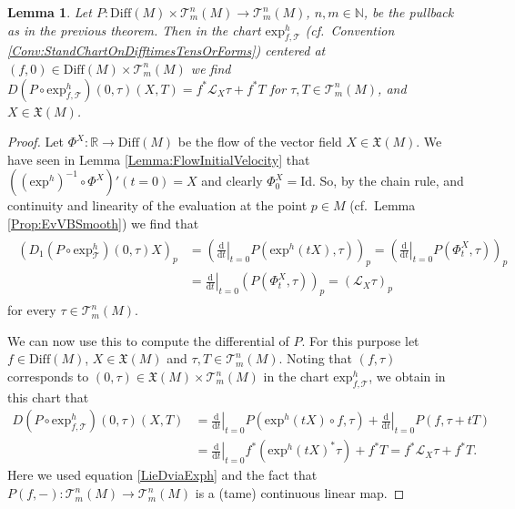 \documentclass[12pt,a4paper]{article}
\theoremstyle{plain}
\newtheorem{lemma}[theorem]{Lemma}
\theoremstyle{definition}
\newcommand{\R}{\mathbb{R}}
\newcommand{\N}{\mathbb{N}}
\newcommand{\VFs}{\mathfrak{X}(M)}
\newcommand{\LieD}{\mathcal{L}}
\newcommand{\Diff}{\mathrm{Diff}(M)}
\newcommand{\eh}[1]{\mathrm{exp}^h(#1)}
\newcommand{\exh}{\mathrm{exp}^h}
\newcommand{\Id}{\mathrm{Id}}
\newcommand{\tensf}[2]{\mathcal{T}^{#1}_{#2}(M)}
\renewcommand{\d}{\mathrm{d}}
\begin{document}
\begin{lemma}
\label{Lemma:PullbackDifferential}
Let $P:\Diff\times \tensf{n}{m}\to \tensf{n}{m}$, $n,m\in \N$, be the pullback as in the previous theorem. Then in the chart $\exh_{f,\mathcal T}$ (cf.~Convention \ref{Conv:StandChartOnDifftimesTensOrForms}) centered at $(f,0)\in \Diff\times \tensf{n}{m}$ we find $D(P\circ \exh_{f,\mathcal T})(0,\tau)(X,T)=f^*\LieD_X \tau+f^*T$ for
$\tau,T\in \tensf{n}{m}$, and $X\in \VFs$.  
\end{lemma}
\begin{proof}
Let $\Phi^X:\R\to \Diff$ be the flow of the vector field $X\in \VFs$. We have seen in Lemma \ref{Lemma:FlowInitialVelocity} that $((\exh)^{-1}\circ \Phi^X)'(t=0)=X$ and clearly $\Phi^X_0=\Id$. So, by the chain rule, and continuity and linearity of the evaluation at the point $p\in M$ (cf.~Lemma \ref{Prop:EvVBSmooth}) we find that
\begin{align}
\begin{split}
\label{LieDviaExph}
    \left(D_1(P\circ \exh_\mathcal{T})(0,\tau)X\right)_p&=\left(\left.\frac{\d}{\d t}\right|_{t=0}P(\eh{tX},\tau)\right)_p  =\left(\left.\frac{\d}{\d t}\right|_{t=0}P(\Phi^X_t,\tau)\right)_p\\
    &=\left.\frac{\d}{\d t}\right|_{t=0}(P(\Phi^X_t,\tau))_p=(\LieD_X\tau)_p
\end{split}
\end{align}
for every $\tau \in \tensf{n}{m}$.

We can now use this to compute the differential of $P$. For this purpose let $f\in \Diff$, $X\in \VFs$ and $\tau,T \in \tensf{n}{m}$. Noting that $(f,\tau)$ corresponds to $(0,\tau)\in \VFs\times \tensf{n}{m}$ in the chart $\exh_{f,\mathcal T}$, we obtain in this chart that
\begin{align*}
    D(P\circ \exh_{f,\mathcal{T}})(0,\tau)(X,T)&=\left.\frac{\d}{\d t}\right|_{t=0}P(\eh{tX}\circ f,\tau)+\left.\frac{\d}{\d t}\right|_{t=0}P(f,\tau+tT)\\
    &=\left.\frac{\d}{\d t}\right|_{t=0}f^*(\eh{tX}^*\tau)+f^*T=f^*\LieD_X\tau+f^*T.
\end{align*}
Here we used equation \eqref{LieDviaExph} and the fact that $P(f,-):\tensf{n}{m}\to \tensf{n}{m}$ is a (tame) continuous linear map.
\end{proof}
\end{document}
